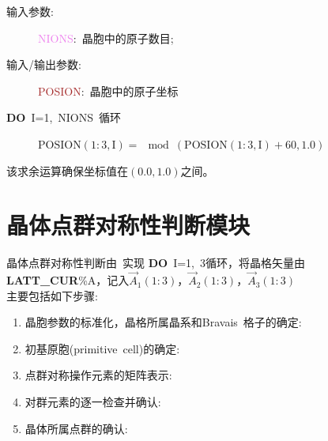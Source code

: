 \documentclass{article}      %
\begin{document}
\vskip 30pt
\begin{description}
	\item[输入参数:~]\textcolor{violet}{\textrm{NIONS}}:~晶胞中的原子数目;
	\item[输入/输出参数:~]\textcolor{brown}{\textrm{POSION}}:~晶胞中的原子坐标
\end{description}
\textbf{DO}~\textrm{I}=1,~\textrm{NIONS}~循环
\begin{description}
	\item[] $\mathrm{POSION(1:3,I)}=\mod{(\mathrm{POSION(1:3,I)}+60,1.0)}$
\end{description}
该求余运算确保坐标值在$(0.0,1.0)$之间。

\section{晶体点群对称性判断模块}\label{tag:Point_symmetry}
晶体点群对称性判断由~实现
\textbf{DO}~\textrm{I}=1,~3循环，将晶格矢量由\textbf{LATT\_CUR}\%\textrm{A}，记入$\vec A_1(1:3)$，$\vec A_2(1:3)$，$\vec A_3(1:3)$\\

主要包括如下步骤:~
\begin{enumerate}
	\item 晶胞参数的标准化，晶格所属晶系和\textrm{Bravais~}格子的确定:~
	\item 初基原胞(\textrm{primitive~cell})的确定:~
	\item 点群对称操作元素的矩阵表示:~
	\item 对群元素的逐一检查并确认:~
	\item 晶体所属点群的确认:~
\end{enumerate}
\end{document}
